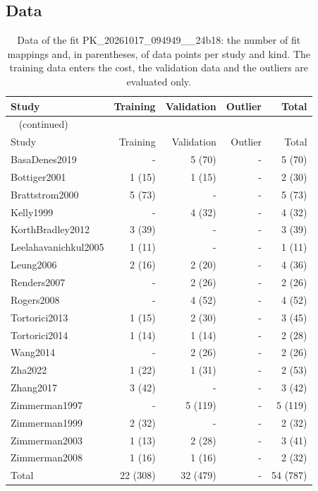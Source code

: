 \documentclass{article}
\begin{document}
\subsection{Data}

\begin{longtable}{lrrrr}
\caption{Data of the fit PK\_20261017\_094949\_\_24b18: the number of fit mappings and, in parentheses, of data points per study and kind. The training data enters the cost, the validation data and the outliers are evaluated only.}\label{tab:data:PK_20261017_094949__24b18} \\
\toprule
Study & Training & Validation & Outlier & Total \\
\midrule
\endfirsthead
\multicolumn{5}{l}{\small\tablename~\thetable{} (continued)} \\
\toprule
Study & Training & Validation & Outlier & Total \\
\midrule
\endhead
\bottomrule
\endlastfoot
BasaDenes2019 & - & 5 (70) & - & 5 (70) \\
Bottiger2001 & 1 (15) & 1 (15) & - & 2 (30) \\
Brattstrom2000 & 5 (73) & - & - & 5 (73) \\
Kelly1999 & - & 4 (32) & - & 4 (32) \\
KorthBradley2012 & 3 (39) & - & - & 3 (39) \\
Leelahavanichkul2005 & 1 (11) & - & - & 1 (11) \\
Leung2006 & 2 (16) & 2 (20) & - & 4 (36) \\
Renders2007 & - & 2 (26) & - & 2 (26) \\
Rogers2008 & - & 4 (52) & - & 4 (52) \\
Tortorici2013 & 1 (15) & 2 (30) & - & 3 (45) \\
Tortorici2014 & 1 (14) & 1 (14) & - & 2 (28) \\
Wang2014 & - & 2 (26) & - & 2 (26) \\
Zha2022 & 1 (22) & 1 (31) & - & 2 (53) \\
Zhang2017 & 3 (42) & - & - & 3 (42) \\
Zimmerman1997 & - & 5 (119) & - & 5 (119) \\
Zimmerman1999 & 2 (32) & - & - & 2 (32) \\
Zimmerman2003 & 1 (13) & 2 (28) & - & 3 (41) \\
Zimmerman2008 & 1 (16) & 1 (16) & - & 2 (32) \\
Total & 22 (308) & 32 (479) & - & 54 (787) \\
\end{longtable}
\end{document}
